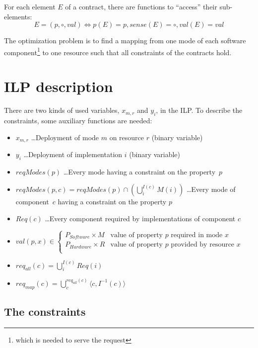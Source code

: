 \documentclass[10pt,a4paper]{article}
\begin{document}
For each element $E$ of a contract, there are functions to ``access'' their sub-elements:
\begin{equation}
	E = (p, \circ, val) \Leftrightarrow p(E) = p, sense(E) = \circ, val(E) = val
\end{equation}

The optimization problem is to find a mapping from one mode of each software component\footnote{which is needed to serve the request} to one resource such that all constraints of the contracts hold.

\section{ILP description}

There are two kinds of used variables, $x_{m,r}$ and $y_{i}$, in the ILP. To describe the constraints, some auxiliary functions are needed:
\begin{itemize}
	\item $x_{m,r}$ \dots Deployment of mode $m$ on resource $r$ (binary variable)
	\item $y_{i}$ \dots Deployment of implementation $i$ (binary variable)
	\item $reqModes(p)$ \dots Every mode having a constraint on the property~$p$
	\item $reqModes(p,c) = reqModes(p) \cap \left( \bigcup\limits_i^{I(c)} M(i) \right)$ \dots Every mode of component~$c$ having a constraint on the property $p$
	\item $Req(c)$ \dots Every component required by implementations of component $c$
	\item
	$
	val(p,x) \in
	\begin{cases}
	P_{Software} \times M & \text{value of property }p\text{ required in mode }x \\
	P_{Hardware} \times R & \text{value of property }p\text{ provided by resource }x \\
	\end{cases}
	$
	\item $req_{all}(c) = \bigcup_i^{I(c)} Req(i) $
	\item $req_{map}(c) = \bigcup_c^{req_{all}(c)} \langle c, I^{-1}(c)  \rangle $
\end{itemize}

\subsection{The constraints}
\end{document}
